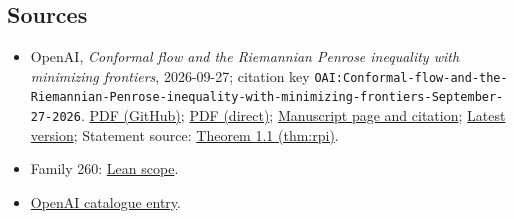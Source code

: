 \documentclass[11pt]{article}
\begin{document}
\subsection{Sources}
\begin{itemize}
\item OpenAI, \emph{Conformal flow and the Riemannian Penrose inequality with minimizing frontiers}, 2026-09-27; citation key \texttt{OAI:Conformal-flow-and-the-Riemannian-Penrose-inequality-with-minimizing-frontiers-September-27-2026}. \href{https://github.com/openai/math/blob/adc7f1241b42e322a6451854ab7e4b4c146bf78a/preprints/Conformal-flow-and-the-Riemannian-Penrose-inequality-with-minimizing-frontiers-September-27-2026/paper.pdf}{PDF (GitHub)}; \href{https://github.com/openai/math/raw/adc7f1241b42e322a6451854ab7e4b4c146bf78a/preprints/Conformal-flow-and-the-Riemannian-Penrose-inequality-with-minimizing-frontiers-September-27-2026/paper.pdf}{PDF (direct)}; \href{https://github.com/openai/math/blob/adc7f1241b42e322a6451854ab7e4b4c146bf78a/preprints/Conformal-flow-and-the-Riemannian-Penrose-inequality-with-minimizing-frontiers-September-27-2026/README.md}{Manuscript page and citation}; \href{https://github.com/openai/math/blob/main/preprints/Conformal-flow-and-the-Riemannian-Penrose-inequality-with-minimizing-frontiers-September-27-2026/paper.pdf}{Latest version}; Statement source: \href{https://github.com/openai/math/blob/adc7f1241b42e322a6451854ab7e4b4c146bf78a/preprints/Conformal-flow-and-the-Riemannian-Penrose-inequality-with-minimizing-frontiers-September-27-2026/build/sections/introduction.tex\#L120}{Theorem 1.1 (thm:rpi)}.
\item Family 260: \href{https://github.com/openai/math/blob/adc7f1241b42e322a6451854ab7e4b4c146bf78a/lean/docs/260.md}{Lean scope}.
\item \href{https://github.com/openai/math/blob/adc7f1241b42e322a6451854ab7e4b4c146bf78a/CONTENTS.md}{OpenAI catalogue entry}.
\end{itemize}
\end{document}
